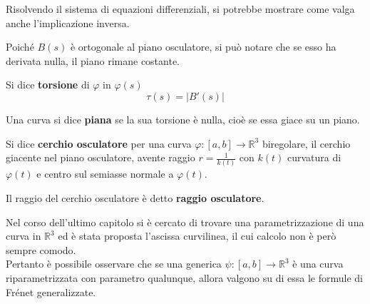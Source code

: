 \begin{oss}
    Risolvendo il sistema di equazioni differenziali, si potrebbe mostrare come valga anche l'implicazione inversa.
\end{oss}
\begin{oss}
    Poiché $B(s)$ è ortogonale al piano osculatore, si può notare che se esso ha derivata nulla, il piano rimane costante.
\end{oss}
\begin{definition}
    Si dice \textbf{torsione} di $\varphi$ in $\varphi(s)$
    \begin{equation}
        \tau(s)=|B'(s)|
    \end{equation}
\end{definition}
\begin{definition}
    Una curva si dice \textbf{piana} se la sua torsione è nulla, cioè se essa giace su un piano.
\end{definition}
\begin{definition}
    Si dice \textbf{cerchio osculatore} per una curva $\varphi:[a,b]\to \mathbb{R}^3$ biregolare, il cerchio giacente nel piano osculatore, avente raggio $r=\frac{1}{k(t)}$ con $k(t)$ curvatura di $\varphi(t)$ e centro sul semiasse normale a $\varphi(t)$.
\end{definition}
\begin{definition}
    Il raggio del cerchio osculatore è detto \textbf{raggio osculatore}.
\end{definition}
Nel corso dell'ultimo capitolo si è cercato di trovare una parametrizzazione di una curva in $\mathbb{R}^3$ ed è stata proposta l'ascissa curvilinea, il cui calcolo non è però sempre comodo.\\
Pertanto è possibile osservare che se una generica $\psi:[a,b]\to \mathbb{R}^3$ è una curva riparametrizzata con parametro qualunque, allora valgono su di essa le formule di Frénet generalizzate.
